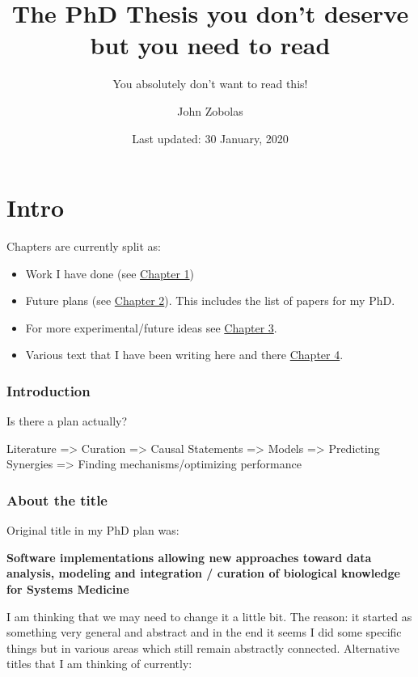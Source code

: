 \documentclass[
  12pt,
]{book}
\title{The PhD Thesis you don't deserve but you need to read}
\subtitle{You absolutely don't want to read this!}
\author{John Zobolas}
\date{Last updated: 30 January, 2020}
\providecommand{\tightlist}{%
  \setlength{\itemsep}{0pt}\setlength{\parskip}{0pt}}
\begin{document}
\maketitle

{
\hypersetup{linkcolor=}
\setcounter{tocdepth}{1}
\tableofcontents
}
\listoftables
\listoffigures
\hypertarget{intro}{%
\chapter*{Intro}\label{intro}}

Chapters are currently split as:

\begin{itemize}
\tightlist
\item
  Work I have done (see \protect\hyperlink{work}{Chapter 1})
\item
  Future plans (see \protect\hyperlink{plans}{Chapter 2}). This includes the list of papers for my PhD.
\item
  For more experimental/future ideas see \protect\hyperlink{ideas}{Chapter 3}.
\item
  Various text that I have been writing here and there \protect\hyperlink{text}{Chapter 4}.
\end{itemize}

\hypertarget{introduction}{%
\subsection*{Introduction}\label{introduction}}

Is there a plan actually?

Literature =\textgreater{} Curation =\textgreater{} Causal Statements =\textgreater{} Models =\textgreater{} Predicting Synergies =\textgreater{} Finding mechanisms/optimizing performance

\hypertarget{about-the-title}{%
\subsection*{About the title}\label{about-the-title}}

Original title in my PhD plan was:

\textbf{Software implementations allowing new approaches toward data analysis, modeling and integration / curation of biological knowledge for Systems Medicine}

I am thinking that we may need to change it a little bit.
The reason: it started as something very general and abstract and in the end it seems I did some specific things but in various areas which still remain abstractly connected.
Alternative titles that I am thinking of currently:
\end{document}
